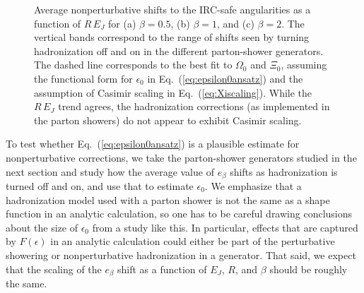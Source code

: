 \documentclass[11pt,letterpaper]{article}
\DeclareRobustCommand{\Eq}[1]{Eq.~(\ref{#1})}
\begin{document}
\begin{figure}
\centering
{}
\caption{Average nonperturbative shifts to the IRC-safe angularities
  as a function of $R \, E_J$ for (a) $\beta = 0.5$, (b) $\beta = 1$,
  and (c) $\beta = 2$.  The vertical bands correspond to the range of
  shifts seen by turning hadronization off and on in the different
  parton-shower generators.  The dashed line corresponds to the best
  fit to $\Omega_0$ and $\Xi_0$, assuming the functional form for
  $\epsilon_0$ in \Eq{eq:epsilon0ansatz} and the assumption of Casimir
  scaling in \Eq{eq:Xiscaling}.  While the $R \, E_J$ trend agrees,
  the hadronization corrections (as implemented in the parton showers)
  do not appear to exhibit Casimir scaling.}
\label{fig:NPshift}
\end{figure}

To test whether \Eq{eq:epsilon0ansatz} is a plausible estimate for nonperturbative corrections, we take the parton-shower generators studied in the next section and study how the average value of $e_\beta$ shifts as hadronization is turned off and on, and use that to estimate $\epsilon_0$.  We emphasize that a hadronization model used with a parton shower is not the same as a shape function in an analytic calculation, so one has to be careful drawing conclusions about the size of $\epsilon_0$ from a study like this.  In particular, effects that are captured by $F(\epsilon)$ in an analytic calculation could either be part of the perturbative showering or nonperturbative hadronization in a generator.  That said, we expect that the scaling of the $e_\beta$ shift as a function of $E_J$, $R$, and $\beta$ should be roughly the same.
\end{document}
